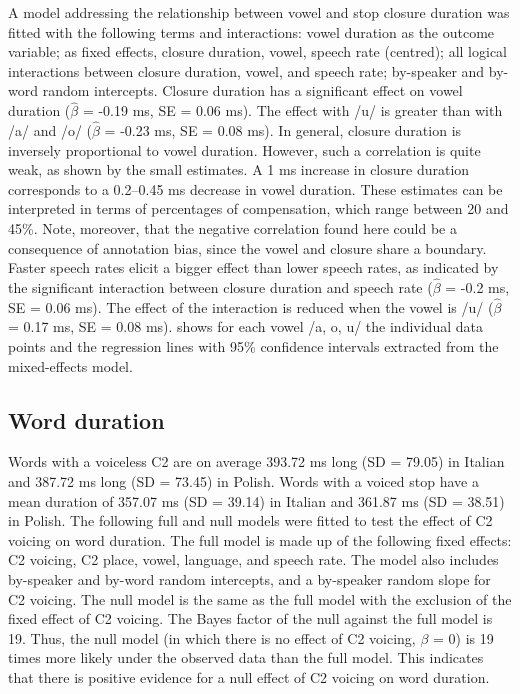 \documentclass[charis]{glossa}
\begin{document}
A model addressing the relationship between vowel and stop closure
duration was fitted with the following terms and interactions: vowel
duration as the outcome variable; as fixed effects, closure duration,
vowel, speech rate (centred); all logical interactions between closure
duration, vowel, and speech rate; by-speaker and by-word random
intercepts. Closure duration has a significant effect on vowel duration
(\(\hat{\beta}\) = -0.19 ms, SE = 0.06 ms). The effect with /u/ is
greater than with /a/ and /o/ (\(\hat{\beta}\) = -0.23 ms, SE = 0.08
ms). In general, closure duration is inversely proportional to vowel
duration. However, such a correlation is quite weak, as shown by the
small estimates. A 1 ms increase in closure duration corresponds to a
0.2--0.45 ms decrease in vowel duration. These estimates can be
interpreted in terms of percentages of compensation, which range between
20 and 45\%. Note, moreover, that the negative correlation found here
could be a consequence of annotation bias, since the vowel and closure
share a boundary. Faster speech rates elicit a bigger effect than lower
speech rates, as indicated by the significant interaction between
closure duration and speech rate (\(\hat{\beta}\) = -0.2 ms, SE = 0.06
ms). The effect of the interaction is reduced when the vowel is /u/
(\(\hat{\beta}\) = 0.17 ms, SE = 0.08 ms).  shows for
each vowel /a, o, u/ the individual data points and the regression lines
with 95\% confidence intervals extracted from the mixed-effects model.

\hypertarget{word-duration}{%
\subsection{Word duration}\label{word-duration}}

Words with a voiceless C2 are on average 393.72 ms long (SD = 79.05) in
Italian and 387.72 ms long (SD = 73.45) in Polish. Words with a voiced
stop have a mean duration of 357.07 ms (SD = 39.14) in Italian and
361.87 ms (SD = 38.51) in Polish. The following full and null models
were fitted to test the effect of C2 voicing on word duration. The full
model is made up of the following fixed effects: C2 voicing, C2 place,
vowel, language, and speech rate. The model also includes by-speaker and
by-word random intercepts, and a by-speaker random slope for C2 voicing.
The null model is the same as the full model with the exclusion of the
fixed effect of C2 voicing. The Bayes factor of the null against the
full model is 19. Thus, the null model (in which there is no effect of
C2 voicing, \(\beta\) = 0) is 19 times more likely under the observed
data than the full model. This indicates that there is positive evidence
for a null effect of C2 voicing on word duration.
\end{document}
